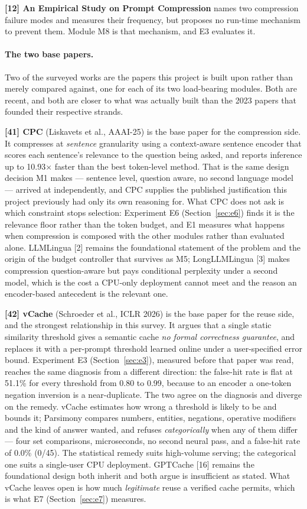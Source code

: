 \documentclass[11pt,a4paper]{article}
\begin{document}
\textbf{[12] An Empirical Study on Prompt Compression} names two compression
failure modes and measures their frequency, but proposes no run-time mechanism
to prevent them. Module M8 is that mechanism, and E3 evaluates it.

\paragraph{The two base papers.} Two of the surveyed works are the papers this
project is built upon rather than merely compared against, one for each of its
two load-bearing modules. Both are recent, and both are closer to what was
actually built than the 2023 papers that founded their respective strands.

\textbf{[41] CPC} (Liskavets et al., AAAI-25) is the base paper for the
compression side. It compresses at \emph{sentence} granularity using a
context-aware sentence encoder that scores each sentence's relevance to the
question being asked, and reports inference up to 10.93$\times$ faster than the
best token-level method. That is the same design decision M1 makes --- sentence
level, question aware, no second language model --- arrived at independently, and
CPC supplies the published justification this project previously had only its
own reasoning for. What CPC does not ask is which constraint stops selection:
Experiment E6 (Section~\ref{sec:e6}) finds it is the relevance floor rather than
the token budget, and E1 measures what happens when compression is composed with
the other modules rather than evaluated alone. LLMLingua [2] remains the
foundational statement of the problem and the origin of the budget controller
that survives as M5; LongLLMLingua [3] makes compression question-aware but pays
conditional perplexity under a second model, which is the cost a CPU-only
deployment cannot meet and the reason an encoder-based antecedent is the
relevant one.

\textbf{[42] vCache} (Schroeder et al., ICLR 2026) is the base paper for the
reuse side, and the strongest relationship in this survey. It argues that a
single static similarity threshold gives a semantic cache \emph{no formal
correctness guarantee}, and replaces it with a per-prompt threshold learned
online under a user-specified error bound. Experiment E3
(Section~\ref{sec:e3}), measured before that paper was read, reaches the same
diagnosis from a different direction: the false-hit rate is flat at 51.1\% for
every threshold from 0.80 to 0.99, because to an encoder a one-token negation
inversion is a near-duplicate. The two agree on the diagnosis and diverge on the
remedy. vCache estimates how wrong a threshold is likely to be and bounds it;
Parsimony compares numbers, entities, negations, operative modifiers and the
kind of answer wanted, and refuses \emph{categorically} when any of them differ
--- four set comparisons, microseconds, no second neural pass, and a false-hit
rate of 0.0\% (0/45). The statistical remedy suits high-volume serving; the
categorical one suits a single-user CPU deployment. GPTCache [16] remains the
foundational design both inherit and both argue is insufficient as stated. What
vCache leaves open is how much \emph{legitimate} reuse a verified cache permits,
which is what E7 (Section~\ref{sec:e7}) measures.
\end{document}
